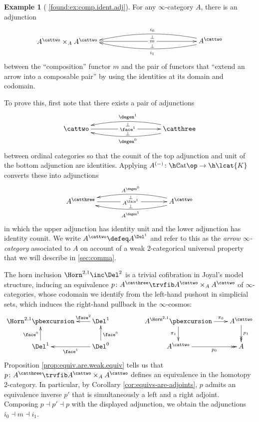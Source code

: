 \documentclass[12pt,reqno]{amsart}
\theoremstyle{plain}
\theoremstyle{definition}
\newtheorem{ex}[thm]{Example}
\theoremstyle{remark}
\numberwithin{equation}{subsection}
\renewcommand{\Cat}{\mathcal{C}\mathrm{at}}
\newcommand{\extRef}[3]{%
  {\protect\IfBeginWith{#3}{itm:}{}{#2.}}\ref*{#1:#3}}
\newcommand{\refI}{\extRef{found}{I}}
\begin{document}
\begin{ex}[{\refI{ex:comp.ident.adj}}]
For any $\infty$-category $A$, there is an adjunction     
\[\xymatrix@C=10em{
      *+[l]{ A^\cattwo\times_AA^\cattwo}
      \ar[r]|*+{\scriptstyle m} &
      {A^\cattwo}
      \ar@/^2.5ex/[l]^{i_1}_{}="l" \ar@/_2.5ex/[l]_{i_0}^{}="u"
      \ar@{} "u";"l" |(0.2){\bot} |(0.8){\bot} 
    }\] between the ``composition'' functor $m$ and the pair of functors that ``extend an arrow into a composable pair'' by using the identities at its domain and codomain.

To prove this, first note that there exists a pair of adjunctions
  \begin{equation*}
    \xymatrix@C=10em@R=1ex{
      {{\cattwo}}\ar[r]|*+{\scriptstyle \face^1} & {{\catthree}}
      \ar@/^2.5ex/[l]^{\degen^0}_{}="l" \ar@/_2.5ex/[l]_{\degen^1}^{}="u"
      \ar@{} "u";"l" |(0.2){\bot} |(0.8){\bot}
    }
  \end{equation*}
between ordinal categories so that the counit of the top adjunction and unit of the bottom adjunction are identities. Applying $A^{(-)} \colon \h\Cat\op\to \h\lcat{K}$ converts these into  adjunctions
  \begin{equation*}
    \xymatrix@C=10em{
      {A^\catthree}
      \ar[r]|*+{\scriptstyle A^{\face^1}} &
      {A^\cattwo}
      \ar@/^2.5ex/[l]^{A^{\degen^1}}_{}="l" \ar@/_2.5ex/[l]_{A^{\degen^0}}^{}="u"
      \ar@{} "u";"l" |(0.2){\bot} |(0.8){\bot} 
    } 
  \end{equation*}
in which the upper adjunction has identity unit and the lower adjunction has identity counit. We write $A^\cattwo \defeq A^{\Del^1}$ and refer to this as the \emph{arrow $\infty$-category} associated to $A$ on account of a weak 2-categorical universal property that we will describe in  \ref{sec:comma}.

The horn inclusion $\Horn^{2,1}\inc\Del^2$ is a trivial cofibration in Joyal's model structure, inducing an equivalence $p \colon A^\catthree \trvfib A^\cattwo \times_A A^\cattwo$ of $\infty$-categories, whose codomain we identify from the left-hand pushout in simplicial sets, which induces the right-hand pullback in the $\infty$-cosmos:
\begin{equation*}
  \xymatrix@=2em{ \Horn^{2,1} \pbexcursion & \Del^1 \ar[l]_-{\face^2} & & 
    {A^{\Horn^{2,1}}}\pbexcursion
    \ar[r]^-{\pi_0}\ar[d]_-{\pi_1} & {A^\cattwo}\ar@{->>}[d]^-{p_1} \\ \Del^1 \ar[u]^{\face^0} & \Del^0 \ar[u]_{\face^0}\ar[l]^-{\face^1} & &
    {A^\cattwo}\ar@{->>}[r]_-{p_0} & A
  }
\end{equation*} 
Proposition \ref{prop:equiv.are.weak.equiv} tells us that $p \colon A^\catthree \trvfib A^\cattwo \times_A A^\cattwo$ defines an equivalence in the homotopy 2-category. In particular, by Corollary \ref{cor:equivs-are-adjoints}, $p$ admits an equivalence inverse $p'$ that is simultaneously a left and a right adjoint. 
Composing $p \dashv p' \dashv p$ with the displayed adjunction, we obtain the adjunctions $i_0 \dashv m \dashv i_1$.


\end{ex}
\end{document}
